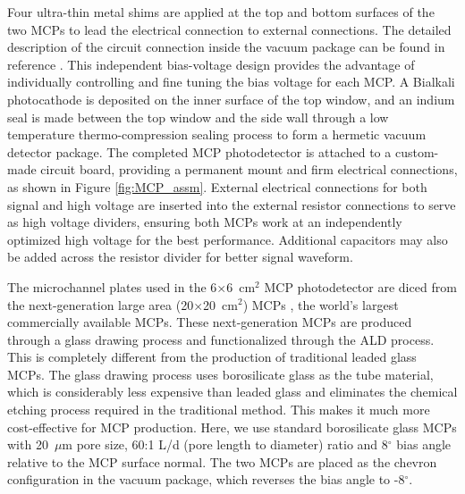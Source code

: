 \documentclass[preprint,5p]{elsarticle}
\begin{document}
Four ultra-thin metal shims are applied at the top and bottom surfaces of the 
two MCPs to lead the electrical connection to external connections. The 
detailed description of the circuit connection inside the vacuum package can be 
found in reference \cite{Xia-MCPs}. This independent bias-voltage design 
provides the advantage of individually controlling and fine tuning the bias 
voltage for each MCP. A Bialkali photocathode is deposited on the inner surface 
of the top window, and an indium seal is made between the top window and the 
side wall through a low temperature thermo-compression sealing process to form 
a hermetic vacuum detector package. The completed MCP photodetector is attached 
to a custom-made circuit board, providing a permanent mount and firm electrical 
connections, as shown in Figure \ref{fig:MCP_assm}. External electrical 
connections for both signal and high voltage are inserted into the external 
resistor connections to serve as high voltage dividers, ensuring both MCPs work 
at an independently optimized high voltage for the best performance.  
Additional capacitors may also be added across the resistor divider for better 
signal waveform.  

The microchannel plates used in the 6$\times$6~cm$^2$ MCP photodetector are 
diced from the next-generation large area (20$\times$20~cm$^2$) MCPs 
\cite{LAPPD,Craven-MCPs}, the world's largest commercially available MCPs.  
These next-generation MCPs are produced through a glass drawing process and 
functionalized through the ALD process. This is completely different from the 
production of traditional leaded glass MCPs. The glass drawing process uses 
borosilicate glass as the tube material, which is considerably less expensive 
than leaded glass and eliminates the chemical etching process required in the 
traditional method. This makes it much more cost-effective for MCP production.  
Here, we use standard borosilicate glass MCPs with 20~$\mu$m pore size, 60:1 
L/d (pore length to diameter) ratio and 8$^{\circ}$ bias angle relative to the 
MCP surface normal. The two MCPs are placed as the chevron configuration in the 
vacuum package, which reverses the bias angle to -8$^{\circ}$. 
\end{document}
